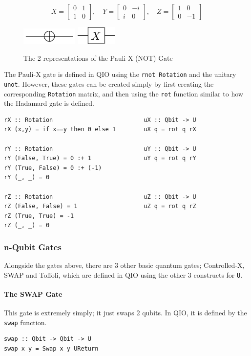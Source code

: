 \documentclass[a4paper,10pt, titlepage, twoside]{article}
\begin{document}
$$
X = 
\begin{bmatrix}
	0 & 1 \\
	1 & 0
\end{bmatrix},
\quad Y =
\begin{bmatrix}
	0 & -i \\
	i & 0
\end{bmatrix},
\quad Z =
\begin{bmatrix}
	1 & 0 \\
	0 & -1
\end{bmatrix}$$
\begin{figure}[H]
	\centering
	\includegraphics[width=0.25\textwidth]{not}
	\includegraphics[width=0.18\textwidth]{paulix}
	\caption{The 2 representations of the Pauli-X (NOT) Gate}
\end{figure}
The Pauli-X gate is defined in QIO using the \texttt{rnot Rotation} and the unitary \texttt{unot}. However, these gates can be created simply by first creating the corresponding \texttt{Rotation} matrix, and then using the \texttt{rot} function similar to how the Hadamard gate is defined.

\begin{verbatim}
rX :: Rotation                          uX :: Qbit -> U
rX (x,y) = if x==y then 0 else 1        uX q = rot q rX

rY :: Rotation                          uY :: Qbit -> U
rY (False, True) = 0 :+ 1               uY q = rot q rY
rY (True, False) = 0 :+ (-1)
rY (_, _) = 0

rZ :: Rotation                          uZ :: Qbit -> U
rZ (False, False) = 1                   uZ q = rot q rZ
rZ (True, True) = -1
rZ (_, _) = 0
\end{verbatim}

\subsubsection{n-Qubit Gates}
Alongside the gates above, there are 3 other basic quantum gates; Controlled-X, SWAP and Toffoli, which are defined in QIO using the other 3 constructs for \texttt{U}.

\paragraph{The SWAP Gate}
This gate is extremely simply; it just swaps 2 qubits. In QIO, it is defined by the \texttt{swap} function.
\begin{verbatim}
swap :: Qbit -> Qbit -> U
swap x y = Swap x y UReturn
\end{verbatim}
\end{document}
